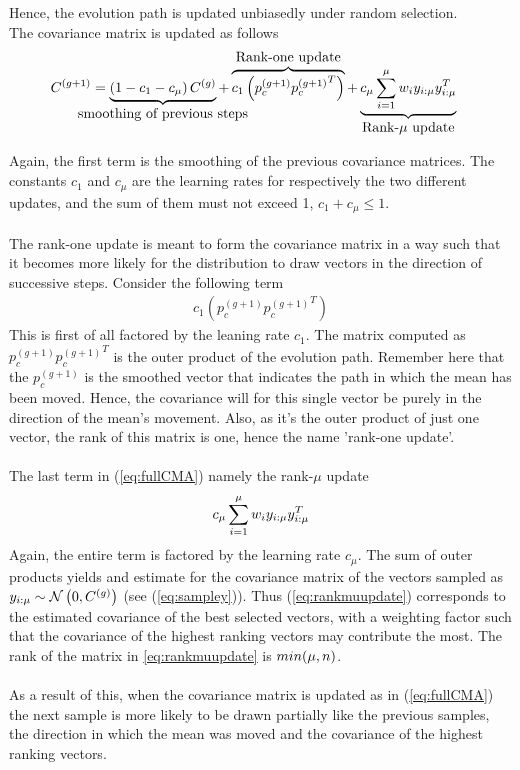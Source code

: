 Hence, the evolution path is updated unbiasedly under random selection.
\\
The covariance matrix is updated as follows
\begin{align}
C^{(g+1)} &= 
\underbrace{\left( 1 - c_{1} - c_{\offspringNumber} \right)C^{(g)}}_{
\makebox[0pt]{\text{{smoothing of previous steps}}}
} + 
\overbrace{c_{1} \left( p_{c}^{(g+1)} {p_{c}^{(g+1)}}^{T}\right)}^{
\makebox[0pt]{\text{{Rank-one update}}}
} +
\underbrace{c_{\offspringNumber} \sum^{\offspringNumber}_{i = 1} w_{i} y_{i : \offspringNumber} y_{i : \offspringNumber} ^{T}}_{
\makebox[0pt]{\text{{Rank-$\mu$ update}}}
} \label{eq:fullCMA}
\end{align}

Again, the first term is the smoothing of the previous covariance matrices.
The constants $c_1$ and $c_\mu$ are the learning rates for respectively the two
different updates, and the sum of them must not exceed 1, $c_1 + c_\mu \leq 1$.\\
\\
The rank-one update is meant to form the covariance matrix in a way such that 
it becomes more likely for the distribution to draw vectors in the direction of
successive steps. Consider the following term
\begin{align}
c_{1} \left( p_{c}^{(g+1)} {p_{c}^{(g+1)}}^{T}\right)
\end{align}
This is first of all factored by the leaning rate $c_1$. The matrix computed as 
$p_{c}^{(g+1)} {p_{c}^{(g+1)}}^{T}$ is the outer product of the evolution path. 
Remember here that the $p_{c}^{(g+1)}$ is the smoothed vector that indicates 
the path in which the mean has been moved. Hence, the covariance will for this 
single vector be purely in the direction of the mean's movement. Also, as it's 
the outer product of just one vector, the rank of this matrix is one, hence the
name 'rank-one update'.\\
\\
The last term in (\ref{eq:fullCMA}) namely the rank-$\mu$ update
\begin{align}
c_{\mu} \sum^{\mu}_{i = 1} w_{i} y_{i : \mu} y_{i : \mu} ^{T} \label{eq:rankmuupdate}
\end{align}
Again, the entire term is factored by the learning rate $c_\mu$. The sum
of outer products yields and estimate for the covariance matrix of the vectors
sampled as $y_{i : \mu} \sim \mathcal{N}\left(0, C^{(g)}\right)$ 
(see (\ref{eq:sampley})). Thus (\ref{eq:rankmuupdate}) corresponds to the 
estimated covariance of the best selected vectors, with a weighting factor
such that the covariance of the highest ranking vectors may contribute the most.
The rank of the matrix in \ref{eq:rankmuupdate} is $min(\mu, n)$.\\
\\
As a result of this, when the covariance matrix is updated as in (\ref{eq:fullCMA})
the next sample is more likely to be drawn partially like the previous 
samples, the direction in which the mean was moved and 
the covariance of the highest ranking vectors.
\\



